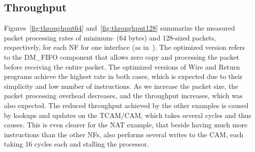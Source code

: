 
\subsection{Throughput}
\label{secsec:throughput}

Figures~\ref{fig:throughput64} and~\ref{fig:throughput128} summarize the measured packet processing rates of minimum- (64 bytes) and 128-sized packets, respectively, for each NF for one interface (as in~\cite{FlowBlaze2019}). The optimized version refers to the DM\_FIFO component that allows zero copy and processing the packet before receiving the entire packet. The optimized versions of Wire and Return programs achieve the highest rate in both cases, which is expected due to their simplicity and low number of instructions. As we increase the packet size, the packet processing overhead decreases, and the throughput increases, which was also expected. The reduced throughput achieved by the other examples is caused by lookups and updates on the TCAM/CAM, which takes several cycles and thus causes. This is even clearer for the NAT example, that beside having much more instructions than the other NFs, also performs several writes to the CAM, each taking 16 cycles each and stalling the processor.

